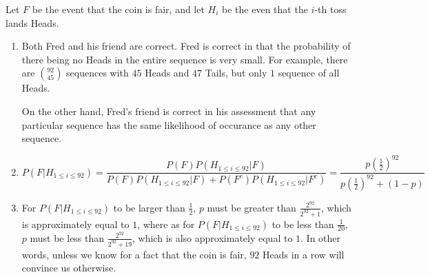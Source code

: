 Let $F$ be the event that the coin is fair, and let $H_{i}$ be the even that the
$i$-th toss lands Heads.

\begin{enumerate}[label=(\alph*)]
\item Both Fred and his friend are correct. Fred is correct in that the
probability of there being no Heads in the entire sequence is very small. For
example, there are $\binom{92}{45}$ sequences with $45$ Heads and $47$ Tails,
but only $1$ sequence of all Heads.

On the other hand, Fred's friend is correct in his assessment that any
particular sequence has the same likelihood of occurance as any other sequence.

\item 
$$P(F|H_{1 \leq i \leq 92}) = \frac{P(F)P(H_{1 \leq i \leq 92}|F)}{P(F)P(H_{1
\leq i \leq 92}|F) + P(F^{c})P(H_{1\leq i \leq 92}|F^{c})} = \frac{p\left
(\frac{1}{2}\right)^{92}}{p\left(\frac{1}{2}\right)^{92} + (1-p)}$$

\item For $P(F|H_{1 \leq i \leq 92})$ to be larger than $\frac{1}{2}$, $p$ must be
greater than $\frac{2^{92}}{2^{92} + 1}$, which is approximately equal to $1$,
where as for $P(F|H_{1 \leq i \leq 92})$ to be less than $\frac{1}{20}$, $p$
must be less than $\frac{2^{92}}{2^{92} + 19}$, which is also approximately
equal to $1$. In other words, unless we know for a fact that the coin is fair,
$92$ Heads in a row will convince us otherwise.
\end{enumerate}